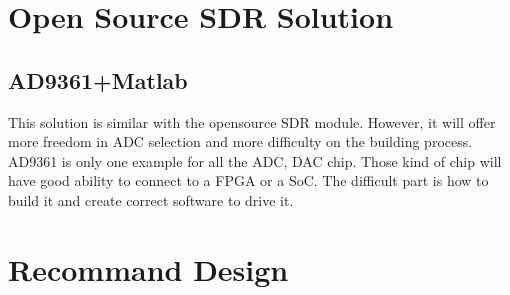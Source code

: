 \documentclass[12pt,article]{memoir}
\begin{document}
\chapter{Open Source SDR Solution}
\section{AD9361+Matlab}
This solution is similar with the opensource SDR module. However, it will offer more freedom in ADC selection and more difficulty on the building process. AD9361 is only one example for all the ADC, DAC chip. Those kind of chip will have good ability to connect to a FPGA or a SoC. The difficult part is how to build it and create correct software to drive it.
\newpage
\chapter{Recommand Design}
\newpage
\end{document}
